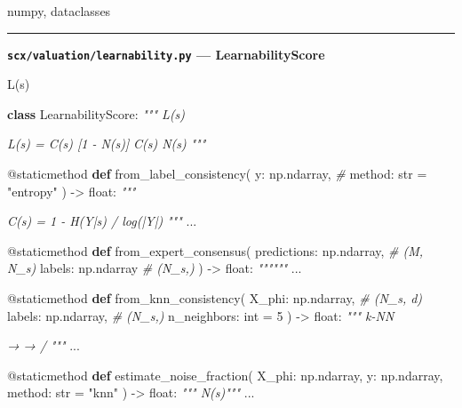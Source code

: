 \documentclass[
  12pt,
]{article}
\newenvironment{Shaded}{}{}
\newcommand{\AttributeTok}[1]{\textcolor[rgb]{0.49,0.56,0.16}{#1}}
\newcommand{\BuiltInTok}[1]{\textcolor[rgb]{0.00,0.50,0.00}{#1}}
\newcommand{\CommentTok}[1]{\textcolor[rgb]{0.38,0.63,0.69}{\textit{#1}}}
\newcommand{\DecValTok}[1]{\textcolor[rgb]{0.25,0.63,0.44}{#1}}
\newcommand{\KeywordTok}[1]{\textcolor[rgb]{0.00,0.44,0.13}{\textbf{#1}}}
\newcommand{\NormalTok}[1]{#1}
\newcommand{\OperatorTok}[1]{\textcolor[rgb]{0.40,0.40,0.40}{#1}}
\newcommand{\StringTok}[1]{\textcolor[rgb]{0.25,0.44,0.63}{#1}}
\begin{document}
numpy, dataclasses

\begin{center}\rule{0.5\linewidth}{0.5pt}\end{center}

\textbf{\texttt{scx/valuation/learnability.py} --- LearnabilityScore}

 L(s) 

\begin{Shaded}
\begin{Highlighting}[]
\KeywordTok{class}\NormalTok{ LearnabilityScore:}
    \CommentTok{""" L(s) }

\CommentTok{    L(s) = C(s)  [1 {-} N(s)]}
\CommentTok{     C(s) N(s) }
\CommentTok{    """}

    \AttributeTok{@staticmethod}
    \KeywordTok{def}\NormalTok{ from\_label\_consistency(}
\NormalTok{        y: np.ndarray,                }\CommentTok{\# }
\NormalTok{        method: }\BuiltInTok{str} \OperatorTok{=} \StringTok{"entropy"}
\NormalTok{    ) }\OperatorTok{{-}\textgreater{}} \BuiltInTok{float}\NormalTok{:}
        \CommentTok{"""}

\CommentTok{        C(s) = 1 {-} H(Y|s) / log(|Y|)  }
\CommentTok{        """}
\NormalTok{        ...}

    \AttributeTok{@staticmethod}
    \KeywordTok{def}\NormalTok{ from\_expert\_consensus(}
\NormalTok{        predictions: np.ndarray,      }\CommentTok{\# (M, N\_s) }
\NormalTok{        labels: np.ndarray            }\CommentTok{\# (N\_s,) }
\NormalTok{    ) }\OperatorTok{{-}\textgreater{}} \BuiltInTok{float}\NormalTok{:}
        \CommentTok{""""""}
\NormalTok{        ...}

    \AttributeTok{@staticmethod}
    \KeywordTok{def}\NormalTok{ from\_knn\_consistency(}
\NormalTok{        X\_phi: np.ndarray,            }\CommentTok{\# (N\_s, d) }
\NormalTok{        labels: np.ndarray,           }\CommentTok{\# (N\_s,) }
\NormalTok{        n\_neighbors: }\BuiltInTok{int} \OperatorTok{=} \DecValTok{5}
\NormalTok{    ) }\OperatorTok{{-}\textgreater{}} \BuiltInTok{float}\NormalTok{:}
        \CommentTok{""" k{-}NN }

\CommentTok{         → }
\CommentTok{        → /}
\CommentTok{        """}
\NormalTok{        ...}

    \AttributeTok{@staticmethod}
    \KeywordTok{def}\NormalTok{ estimate\_noise\_fraction(}
\NormalTok{        X\_phi: np.ndarray,}
\NormalTok{        y: np.ndarray,}
\NormalTok{        method: }\BuiltInTok{str} \OperatorTok{=} \StringTok{"knn"}
\NormalTok{    ) }\OperatorTok{{-}\textgreater{}} \BuiltInTok{float}\NormalTok{:}
        \CommentTok{""" N(s)"""}
\NormalTok{        ...}
\end{Highlighting}
\end{Shaded}
\end{document}
